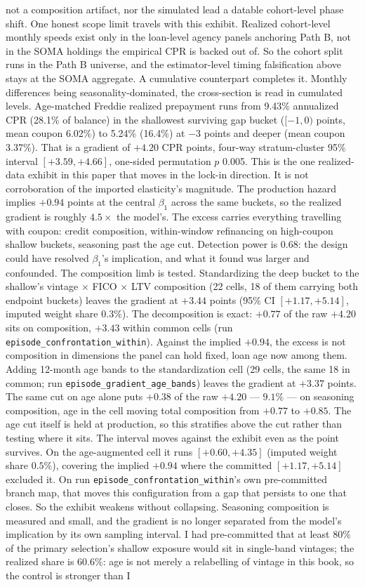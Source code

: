\documentclass[12pt]{article}
\begin{document}
not a composition artifact, nor the simulated lead a datable cohort-level phase shift. One honest scope limit travels with this exhibit. Realized cohort-level monthly speeds exist only in the loan-level agency panels anchoring Path B, not in the SOMA holdings the empirical CPR is backed out of. So the cohort split runs in the Path B universe, and the estimator-level timing falsification above stays at the SOMA aggregate. A cumulative counterpart completes it. Monthly differences being seasonality-dominated, the cross-section is read in cumulated levels. Age-matched Freddie realized prepayment runs from 9.43\% annualized CPR (28.1\% of balance) in the shallowest surviving gap bucket ($[-1,0)$ points, mean coupon 6.02\%) to 5.24\% (16.4\%) at $-3$ points and deeper (mean coupon 3.37\%). That is a gradient of $+4.20$ CPR points, four-way stratum-cluster 95\% interval $[+3.59, +4.66]$, one-sided permutation $p$ 0.005. This is the one realized-data exhibit in this paper that moves in the lock-in direction. It is not corroboration of the imported elasticity's magnitude. The production hazard implies $+0.94$ points at the central $\beta_1$ across the same buckets, so the realized gradient is roughly $4.5\times$ the model's. The excess carries everything travelling with coupon: credit composition, within-window refinancing on high-coupon shallow buckets, seasoning past the age cut. Detection power is 0.68: the design could have resolved $\beta_1$'s implication, and what it found was larger and confounded. The composition limb is tested. Standardizing the deep bucket to the shallow's vintage $\times$ FICO $\times$ LTV composition (22 cells, 18 of them carrying both endpoint buckets) leaves the gradient at $+3.44$ points (95\% CI $[+1.17, +5.14]$, imputed weight share $0.3\%$). The decomposition is exact: $+0.77$ of the raw $+4.20$ sits on composition, $+3.43$ within common cells (run \texttt{episode\_confrontation\_within}). Against the implied $+0.94$, the excess is not composition in dimensions the panel can hold fixed, loan age now among them. Adding 12-month age bands to the standardization cell (29 cells, the same 18 in common; run \texttt{episode\_gradient\_age\_bands}) leaves the gradient at $+3.37$ points. The same cut on age alone puts $+0.38$ of the raw $+4.20$ --- $9.1\%$ --- on seasoning composition, age in the cell moving total composition from $+0.77$ to $+0.85$. The age cut itself is held at production, so this stratifies above the cut rather than testing where it sits. The interval moves against the exhibit even as the point survives. On the age-augmented cell it runs $[+0.60, +4.35]$ (imputed weight share $0.5\%$), covering the implied $+0.94$ where the committed $[+1.17, +5.14]$ excluded it. On run \texttt{episode\_confrontation\_within}'s own pre-committed branch map, that moves this configuration from a gap that persists to one that closes. So the exhibit weakens without collapsing. Seasoning composition is measured and small, and the gradient is no longer separated from the model's implication by its own sampling interval. I had pre-committed that at least $80\%$ of the primary selection's shallow exposure would sit in single-band vintages; the realized share is $60.6\%$: age is not merely a relabelling of vintage in this book, so the control is stronger than I 
\end{document}
